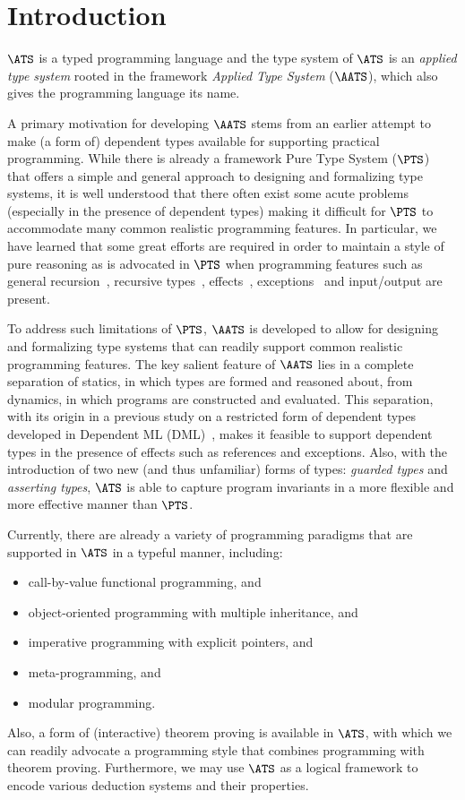 \chapter{Introduction}
$\ATS$ is a typed programming language and the type system of $\ATS$ is an
{\em applied type system} rooted in the framework {\em Applied Type System}
($\AATS$), which also gives the programming language its name.

A primary motivation for developing $\AATS$ stems from an earlier attempt
to make (a form of) dependent types available for supporting practical
programming. While there is already a framework Pure Type System
($\PTS$)~\cite{barendregt92} that offers a simple and general approach to
designing and formalizing type systems, it is well understood that there
often exist some acute problems (especially in the presence of dependent
types) making it difficult for $\PTS$ to accommodate many common realistic
programming features.  In particular, we have learned that some great
efforts are required in order to maintain a style of pure reasoning as is
advocated in $\PTS$ when programming features such as general
recursion~\cite{constable87}, recursive types~\cite{mendler87},
effects~\cite{HMST95}, exceptions~\cite{HN88} and input/output are present.

To address such limitations of $\PTS$, $\AATS$ is developed to allow for
designing and formalizing type systems that can readily support common
realistic programming features.  The key salient feature of $\AATS$ lies in
a complete separation of statics, in which types are formed and
reasoned about, from dynamics, in which programs are constructed and
evaluated. This separation, with its origin in a previous study on a
restricted form of dependent types developed in Dependent ML
(DML)~\cite{XP99,XiThesis}, makes it feasible to support dependent types in
the presence of effects such as references and exceptions. Also, with the
introduction of two new (and thus unfamiliar) forms of types: {\em guarded
types} and {\em asserting types}, $\ATS$ is able to capture program
invariants in a more flexible and more effective manner than $\PTS$.

Currently, there are already a variety of programming paradigms that are
supported in $\ATS$ in a typeful manner, including:
\begin{itemize}
\item call-by-value functional programming, and
\item object-oriented programming with multiple inheritance, and
\item imperative programming with explicit pointers, and
\item meta-programming, and
\item modular programming.
\end{itemize}
Also, a form of (interactive) theorem proving is available in $\ATS$, with
which we can readily advocate a programming style that combines programming
with theorem proving. Furthermore, we may use $\ATS$ as a logical framework
to encode various deduction systems and their properties.

